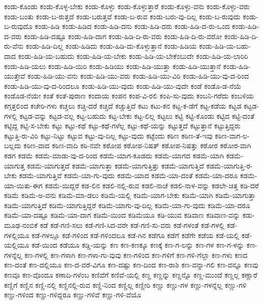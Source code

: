 {ಕಂಡು-ಕೊಂಡು
ಕಂಡು-ಕೊಳ್ಳ-ಬೇಕು
ಕಂಡು-ಕೊಳ್ಳು
ಕಂಡು-ಕೊಳ್ಳುತ್ತಾರೆ
ಕಂಡು-ಕೊಳ್ಳು-ವನು
ಕಂಡು-ಕೊಳ್ಳು-ವರು
ಕಂಡು-ಬಂತು
ಕಂಡು-ಬ-ರುತ್ತದೆ
ಕಂಡು-ಬರುತ್ತವೆ
ಕಂಡು-ಬ-ರುವ
ಕಂಡು-ಬರು-ವು-ದಿಲ್ಲ
ಕಂಡು-ಬ-ರುವುದು
ಕಂಡು-ಬ-ರುವುದೊ
ಕಂಡು-ಹಿಡಿ
ಕಂಡು-ಹಿಡಿದ
ಕಂಡು-ಹಿಡಿ-ದನು
ಕಂಡು-ಹಿಡಿ-ದರು
ಕಂಡು-ಹಿಡಿ-ದ-ರು-ಒಂದ
ಕಂಡು-ಹಿಡಿ-ದ-ವರು
ಕಂಡು-ಹಿಡಿ-ದಷ್ಟೂ
ಕಂಡು-ಹಿಡಿ-ದಾಗ
ಕಂಡು-ಹಿಡಿ-ದಿ-ರು-ವರು
ಕಂಡು-ಹಿಡಿ-ದಿ-ರು-ವರೋ
ಕಂಡು-ಹಿಡಿ-ದಿ-ರು-ವೆನು
ಕಂಡು-ಹಿಡಿ-ದಿಲ್ಲ
ಕಂಡು-ಹಿಡಿದು
ಕಂಡು-ಹಿಡಿ-ದು-ಕೊಳ್ಳುತ್ತಾನೆ
ಕಂಡು-ಹಿಡಿಯ
ಕಂಡು-ಹಿಡಿ-ಯ-ಬಹು-ದಾದ
ಕಂಡು-ಹಿಡಿ-ಯ-ಬಹುದು
ಕಂಡು-ಹಿಡಿ-ಯ-ಬೇಕು
ಕಂಡು-ಹಿಡಿ-ಯ-ಬೇಕೆಂಬುದೇ
ಕಂಡು-ಹಿಡಿ-ಯ-ಲಾರಿರಿ
ಕಂಡು-ಹಿಡಿ-ಯಲು
ಕಂಡು-ಹಿಡಿ-ಯಿರಿ
ಕಂಡು-ಹಿಡಿಯು
ಕಂಡು-ಹಿಡಿ-ಯುತ್ತಾ
ಕಂಡು-ಹಿಡಿ-ಯುತ್ತಾನೆ
ಕಂಡು-ಹಿಡಿ-ಯುತ್ತೇವೆ
ಕಂಡು-ಹಿಡಿ-ಯು-ವನು
ಕಂಡು-ಹಿಡಿ-ಯು-ವರು
ಕಂಡು-ಹಿಡಿ-ಯು-ವಿರಿ
ಕಂಡು-ಹಿಡಿ-ಯು-ವು-ದ-ರಿಂದ
ಕಂಡು-ಹಿಡಿ-ಯು-ವು-ದ-ರಿಂದಲೂ
ಕಂಡು-ಹಿಡಿ-ಯು-ವುದು
ಕಂಡು-ಹಿಡಿ-ಯು-ವುದೇ
ಕಂಡೆ
ಕಂಡೊ-ಡ-ನೆಯೆ
ಕಂಡೊಡ-ನೆಯೇ
ಕಂತೆ
ಕಂತೆ-ಪುರಾಣ
ಕಂದಾಯ
ಕಂಪನ
ಕಂಪ-ವಿ-ರಲಿ
ಕಂಪಿ-ಸು-ವುದು
ಕಂಬನಿ-ಗರೆದು
ಕಂಬಳಿಯ
ಕಗ್ಗತ್ತಲಿಂದ
ಕಚೇರಿ-ಗಳು
ಕಚ್ಚಲು
ಕಚ್ಚಿ-ದರೆ
ಕಚ್ಚಿದೆ
ಕಚ್ಚುತ್ತಿದೆ
ಕಟು
ಕಟು-ಕನ
ಕಟ್ಟ-ಕ-ಡೆಗೆ
ಕಟ್ಟ-ಕಡೆಯ
ಕಟ್ಟಡ
ಕಟ್ಟಡ-ಗಳಲ್ಲಿ
ಕಟ್ಟಡ-ವನ್ನು
ಕಟ್ಟಡ-ವಲ್ಲ
ಕಟ್ಟ-ಬಹುದು
ಕಟ್ಟ-ಬೇಕು
ಕಟ್ಟ-ಲಿಲ್ಲ
ಕಟ್ಟಲು
ಕಟ್ಟಿ
ಕಟ್ಟಿ-ಕೊಂಡು
ಕಟ್ಟಿದ
ಕಟ್ಟಿ-ದಂತೆ
ಕಟ್ಟಿದ್ದ
ಕಟ್ಟಿ-ಸ-ಬೇಕು
ಕಟ್ಟು
ಕಟ್ಟು-ಕಥೆ
ಕಟ್ಟು-ಕಥೆ-ಗಳೆಲ್ಲ
ಕಟ್ಟು-ಕಥೆ-ಯನ್ನು
ಕಟ್ಟುತ್ತದೆ
ಕಟ್ಟುತ್ತಾನೆ
ಕಟ್ಟುತ್ತಿದ್ದರು
ಕಟ್ಟುತ್ತಿ-ರು-ವಿರಿ
ಕಟ್ಟು-ನಿಟ್ಟು
ಕಟ್ಟುವ
ಕಟ್ಟು-ವು-ದಿಲ್ಲ
ಕಟ್ಟು-ವುದು
ಕಟ್ಟೆಂದು
ಕಠಿಣ
ಕಠಿಣ-ತೆ-ಇವು
ಕಠಿಣ-ವಾಗ-ಲ-ಬಲ್ಲದು
ಕಠಿಣ-ವಾದ
ಕಠಿಣ-ವಾದಿ
ಕಠಿ-ನವೇ
ಕಠೋಪ
ಕಠೋಪ-ನಿಷತ್
ಕಠೋಪ-ನಿಷತ್ತು
ಕಠೋರ
ಕಠೋರ-ವಾಗಿ
ಕಡಗ
ಕಡಮೆ
ಕಡಮೆ-ಮಾಡು-ವು-ದ-ರಿಂದ
ಕಡಮೆ-ಯಾಗ-ಕೂಡದು
ಕಡಮೆ-ಯಾಗದ
ಕಡಮೆ-ಯಾಗಿ
ಕಡಮೆ-ಯಾಗುತ್ತ
ಕಡಮೆ-ಯಾಗುತ್ತದೆ
ಕಡಮೆ-ಯಾಗುತ್ತಾ
ಕಡಮೆ-ಯಾಗುತ್ತಿತ್ತು
ಕಡಮೆ-ಯಾಗುತ್ತಿದೆ
ಕಡಮೆ-ಯಾಗುತ್ತಿ-ರ-ಬೇಕು
ಕಡಮೆ-ಯಾಗುತ್ತಿವೆ
ಕಡಮೆ-ಯಾ-ಗು-ವುದು
ಕಡಮೆ-ಯಾದ
ಕಡಮೆ-ಯಾ-ದಂತೆ
ಕಡಮೆ-ಯಾ-ದರೂ
ಕಡಮೆ-ಯಾ-ಯಿತು-ಈಗ
ಕಡಮೆ-ಯಿದ್ದರೆ
ಕಡ-ಲಿನ
ಕಡಲಿ-ನಲ್ಲಿ-ರುವ
ಕಡಲಿ-ನಾಚೆ
ಕಡಲಿ-ನಾಳ-ವನ್ನು
ಕಡಲೇ-ಚಿತ್ತ
ಕಡಿ-ದರೆ
ಕಡಿಮೆ
ಕಡಿಮೆ-ಅ-ವನು
ಕಡಿಮೆ-ಮಾ-ಡಲು
ಕಡಿಮೆ-ಯಲ್ಲಿ
ಕಡಿಮೆ-ಯಾಗ-ಬೇಕು
ಕಡಿಮೆ-ಯಾಗಿ
ಕಡಿಮೆ-ಯಾಗುತ್ತಾ
ಕಡಿಮೆ-ಯಾಗುತ್ತಿದೆ
ಕಡಿಮೆ-ಯಾಗುತ್ತಿದ್ದರೆ
ಕಡಿಮೆ-ಯಾಗು-ವು-ದಿಲ್ಲ
ಕಡಿಮೆ-ಯಾ-ಗು-ವುದು
ಕಡಿಮೆ-ಯಾ-ದರೂ
ಕಡಿಮೆ-ಯಾ-ದಷ್ಟೂ
ಕಡಿಮೆ-ಯಾ-ದಾಗ
ಕಡಿಮೆ-ಯಿಂದ
ಕಡಿಮೆಯೂ
ಕಡಿ-ಯುವ
ಕಡಿವಾಣ
ಕಡಿವಾಣ-ವನ್ನು
ಕಡು-ಮೂಢ-ನಂಬಿಕೆ
ಕಡೆ
ಕಡೆ-ಗಣಿ-ಸಲು
ಕಡೆ-ಗಣಿ-ಸಿದ-ವರೇ
ಕಡೆ-ಗಣಿ-ಸು-ವರು
ಕಡೆ-ಗಳಂತೆ
ಕಡೆ-ಗಳಲ್ಲಿ
ಕಡೆ-ಗಳಲ್ಲಿಯೂ
ಕಡೆ-ಗಳಲ್ಲೂ
ಕಡೆ-ಗಳಿಂದ
ಕಡೆ-ಗಳಿಂದಲೂ
ಕಡೆ-ಗಿನ
ಕಡೆಗೂ
ಕಡೆಗೆ
ಕಡೆಗೇ
ಕಡೆಯ
ಕಡೆ-ಯಲ್ಲಿ
ಕಡೆ-ಯಲ್ಲಿಯೂ
ಕಡೆ-ಯಿಂದ
ಕಡೆಯೂ
ಕಡ್ಡಿ-ಯನ್ನು
ಕಣ
ಕಣ-ಕಣಕ್ಕೂ
ಕಣಕ್ಕೆ
ಕಣ-ಗ-ಲನ್ನು
ಕಣ-ಗಳ
ಕಣ-ಗ-ಳನ್ನು
ಕಣ-ಗಳನ್ನೆಲ್ಲ
ಕಣ-ಗಳಲ್ಲಿ
ಕಣ-ಗಳಾಗಿ
ಕಣ-ಗಳಾ-ಗು-ವುವು
ಕಣ-ಗಳಿಂದ
ಕಣ-ಗಳಿಗೆ
ಕಣ-ಗಳಿ-ಗೆಲ್ಲಾ
ಕಣ-ಗಳು
ಕಣದ
ಕಣ-ದಂತೆ
ಕಣ-ದಲ್ಲಿಯೂ
ಕಣ-ದ-ವರೆ-ವಿಗೂ
ಕಣ-ದಷ್ಟು
ಕಣ-ದಿಂದ
ಕಣ-ರಾಶಿ
ಕಣ-ವನ್ನಾ-ಗಲಿ
ಕಣ-ವನ್ನೂ
ಕಣವು
ಕಣವೂ
ಕಣ-ವೊಂದೂ
ಕಣಾದಿ-ಗಳೆಂಬ
ಕಣಿವೆಗೆ
ಕಣಿವೆ-ಯಲ್ಲಿ
ಕಣ್ಣ
ಕಣ್ಣನ್ನು
ಕಣ್ಣನ್ನೊ
ಕಣ್ಣ-ಮುಂದೆ
ಕಣ್ಣಲ್ಲ
ಕಣ್ಣಾರೆ
ಕಣ್ಣಿಗೆ
ಕಣ್ಣಿನ
ಕಣ್ಣಿ-ನಲ್ಲಿ
ಕಣ್ಣಿನಲ್ಲಿ-ರುವ
ಕಣ್ಣಿ-ನಿಂದ
ಕಣ್ಣಿಲ್ಲ
ಕಣ್ಣೀರಿ
ಕಣ್ಣು
ಕಣ್ಣು-ಗಳ
ಕಣ್ಣು-ಗಳನ್ನೆಲ್ಲ
ಕಣ್ಣು-ಗಳಿ
ಕಣ್ಣು-ಗಳಿಂದ
ಕಣ್ಣು-ಗಳಿದ್ದರೂ
ಕಣ್ಣು-ಗಳಿವೆ
ಕಣ್ಣು-ಗಳಿ-ವೆಯೊ
}

